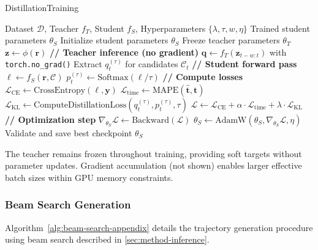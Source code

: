 \begin{algorithm}[H]
\caption{DistillationTraining}
\label{alg:distill-train-appendix}
\begin{algorithmic}
\Require Dataset $\mathcal{D}$, Teacher $f_T$, Student $f_S$, Hyperparameters $\{\lambda, \tau, w, \eta\}$
\Ensure Trained student parameters $\theta_S$
\State Initialize student parameters $\theta_S$
\State Freeze teacher parameters $\theta_T$ 
     
        \State $\mathbf{z} \gets \phi(\mathbf{r})$ 
        \State \textbf{// Teacher inference (no gradient)}
        \State $\mathbf{q} \gets f_T(\mathbf{z}_{t-w:t})$ with \texttt{torch.no\_grad()}
        \State Extract $q_t^{(\tau)}$ for candidates $\mathcal{C}_t$ 
        \State \textbf{// Student forward pass}
        \State $\mathbf{\ell} \gets f_S(\mathbf{r}, \mathcal{C})$ 
        \State $p_t^{(\tau)} \gets \text{Softmax}(\mathbf{\ell} / \tau)$
        \State \textbf{// Compute losses}
        \State $\mathcal{L}_{\text{CE}} \gets \text{CrossEntropy}(\mathbf{\ell}, \mathbf{y})$
        \State $\mathcal{L}_{\text{time}} \gets \text{MAPE}(\hat{\mathbf{t}}, \mathbf{t})$
        \State $\mathcal{L}_{\text{KL}} \gets \text{ComputeDistillationLoss}(q_t^{(\tau)}, p_t^{(\tau)}, \tau)$
        \State $\mathcal{L} \gets \mathcal{L}_{\text{CE}} + \alpha \cdot \mathcal{L}_{\text{time}} + \lambda \cdot \mathcal{L}_{\text{KL}}$
        \State \textbf{// Optimization step}
        \State $\nabla_{\theta_S} \mathcal{L} \gets \text{Backward}(\mathcal{L})$
        \State $\theta_S \gets \text{AdamW}(\theta_S, \nabla_{\theta_S} \mathcal{L}, \eta)$
    \EndFor
    \State Validate and save best checkpoint
\EndFor
\State \Return $\theta_S$
\end{algorithmic}
\end{algorithm}

The teacher remains frozen throughout training, providing soft targets without parameter updates. Gradient accumulation (not shown) enables larger effective batch sizes within GPU memory constraints.

\subsubsection{Beam Search Generation}
\label{app:beam-search-alg}

Algorithm~\ref{alg:beam-search-appendix} details the trajectory generation procedure using beam search described in \autoref{sec:method-inference}.

